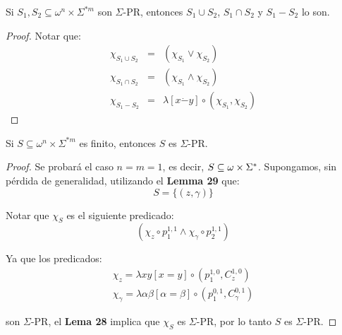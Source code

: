   \pagebreak
  \begin{lemma}
    \PN Si $S_{1}, S_{2} \subseteq \omega^{n} \times \Sigma^{\ast m}$ son $\Sigma$-PR, entonces $S_{1} \cup S_{2}$,
    $S_{1} \cap S_{2}$ y $S_{1} - S_{2}$ lo son.
  \end{lemma}
  \begin{proof}
    \PN Notar que:
    \begin{eqnarray*}
      \chi_{S_{1} \cup S_{2}} &=& (\chi_{S_{1}} \vee \chi_{S_{2}}) \\
      \chi_{S_{1} \cap S_{2}} &=& (\chi_{S_{1}} \wedge \chi_{S_{2}}) \\
      \chi_{S_{1} - S_{2}} &=& \lambda \left[x \dot{-} y\right] \circ (\chi_{S_{1}}, \chi_{S_{2}})
    \end{eqnarray*}
  \end{proof}

  \begin{corollary}
    \PN Si $S \subseteq \omega^{n} \times \Sigma^{\ast m}$ es finito, entonces $S$ es $\Sigma$-PR.
  \end{corollary}
  \begin{proof}
    \PN Se probará el caso $n = m = 1$, es decir, $S \subseteq \omega \times \Sigma^{\ast}$. Supongamos, sin pérdida de
    generalidad, utilizando el \textbf{Lemma 29} que:
    \[
      S = \{(z, \gamma)\}
    \]

    \PN Notar que $\chi_{S}$ es el siguiente predicado:
    \[
      \left(\chi_{z} \circ p_{1}^{1,1} \wedge \chi_{\gamma} \circ p_{2}^{1,1}\right)
    \]

    \PN Ya que los predicados:
    \begin{eqnarray*}
      \chi_{z} = \lambda xy \left[x = y\right] \circ \left(p_{1}^{1,0}, C_{z}^{1,0}\right) \\
      \chi_{\gamma} = \lambda \alpha\beta \left[\alpha = \beta\right] \circ \left(p_{1}^{0,1},
      C_{\gamma}^{0,1}\right)
    \end{eqnarray*}

    \PN son $\Sigma$-PR, el \textbf{Lema 28} implica que $\chi_{S}$ es $\Sigma$-PR, por lo tanto $S$ es $\Sigma$-PR.
  \end{proof}

